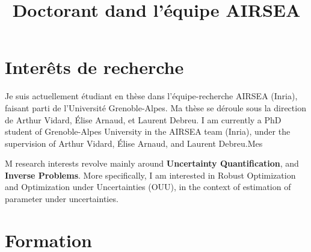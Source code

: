 \documentclass[11pt,a4paper,sans]{moderncv} %
\title{Doctorant dand l'équipe AIRSEA} %
\begin{document}








\makecvtitle%

\section{Interêts de recherche}
Je suis actuellement étudiant en thèse dans l'équipe-recherche AIRSEA (Inria), faisant parti de l'Université Grenoble-Alpes. Ma thèse se déroule sous la direction de Arthur Vidard, Élise Arnaud, et Laurent Debreu.
I am currently a PhD student of Grenoble-Alpes University in the AIRSEA team (Inria), under the supervision of Arthur Vidard, Élise Arnaud, and Laurent Debreu.\@ Mes

M research interests revolve mainly around \textbf{Uncertainty Quantification}, and \textbf{Inverse Problems}. More specifically, I am interested in Robust Optimization and Optimization under Uncertainties (OUU), in the context of estimation of parameter under uncertainties.
\section{Formation}
\end{document}
